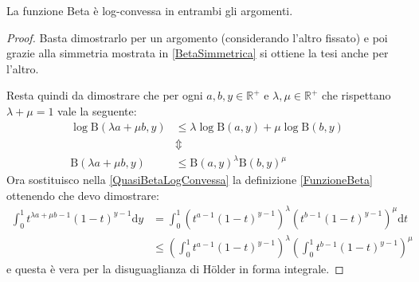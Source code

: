 \begin{lemma}\label{BetaLogConvessa} 
	La funzione Beta è log-convessa in entrambi gli argomenti.
\end{lemma}
\begin{proof}
	Basta dimostrarlo per un argomento (considerando l'altro fissato) e poi grazie alla simmetria mostrata in \cref{BetaSimmetrica}
	si ottiene la tesi anche per l'altro.
	
	Resta quindi da dimostrare che per ogni $a,b,y\in\mathbb{R^+}$ e $\lambda,\mu\in\mathbb{R^+}$ che rispettano $\lambda+\mu=1$ vale la seguente:
	\begin{equation}\begin{split}\label{QuasiBetaLogConvessa}
		\log \mathrm{B}(\lambda a+\mu b, y )  & \le \lambda \log \mathrm{B}(a, y ) + \mu\log \mathrm{B}( b, y )\\
		& \Updownarrow  \\
		\mathrm{B}(\lambda a+\mu b, y ) & \le  \mathrm{B}(a,y)^{\lambda}\mathrm{B}(b, y )^{\mu}
	\end{split}\end{equation}
	Ora sostituisco nella \cref{QuasiBetaLogConvessa} la definizione \cref{FunzioneBeta} ottenendo che devo dimostrare:
	\begin{equation*}
	\begin{split}
		\int_{0}^1 t^{\lambda a+\mu b-1}(1-t)^{y-1}\mathrm{d}y &=
		\int_{0}^1 \left(t^{a-1}(1-t)^{y-1}\right)^{\lambda}\left(t^{b-1}(1-t)^{y-1}\right)^{\mu}\mathrm{d}t\\
		& \le
		\left(\int_{0}^1 t^{a-1}(1-t)^{y-1}\right)^{\lambda}\left(\int_{0}^1 t^{b-1}(1-t)^{y-1}\right)^{\mu}
	\end{split}
	\end{equation*}
	e questa è vera per la disuguaglianza di Hölder in forma integrale.

\end{proof}

